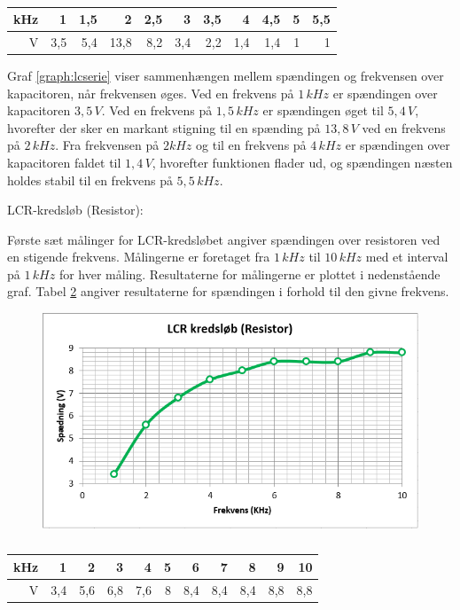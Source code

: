 \begin{table}[H]
\centering
\begin{tabular}{|r|r|r|r|r|r|r|r|r|r|r|} \hline
kHz & 1 & 1,5 & 2 & 2,5 & 3 & 3,5 & 4 & 4,5 & 5 & 5,5 \\ \hline
V & 3,5 & 5,4 & 13,8 & 8,2 & 3,4 & 2,2 & 1,4 & 1,4 & 1 & 1 \\ \hline
\end{tabular}
\caption{}
\label{tabular:lcserie}
\end{table}

Graf \ref{graph:lcserie} viser sammenhængen mellem spændingen og frekvensen over kapacitoren, når frekvensen øges. Ved en frekvens på $1\, kHz$ er spændingen over kapacitoren $3,5\, V$. Ved en frekvens på $1,5\, kHz$ er spændingen øget til $5,4\, V$, hvorefter der sker en markant stigning til en spænding på $13,8\, V$ ved en frekvens på $2\, kHz$. Fra frekvensen på $2 kHz$ og til en frekvens på $4\, kHz$ er spændingen over kapacitoren faldet til $1,4\, V$, hvorefter funktionen flader ud, og spændingen næsten holdes stabil til en frekvens på $5,5\, kHz$.

LCR-kredsløb (Resistor):

Første sæt målinger for LCR-kredsløbet angiver spændingen over resistoren ved en stigende frekvens. Målingerne er foretaget fra $1\, kHz$ til $10\, kHz$ med et interval på $1\, kHz$ for hver måling. Resultaterne for målingerne er plottet i nedenstående graf. Tabel \ref{tabular:lcrmodstand} angiver resultaterne for spændingen i forhold til den givne frekvens.

\begin{figure}[H]
\includegraphics[scale=1]{Setup/Graf7}
\caption{}
\label{graph:lcrmodstand}
\end{figure}

\begin{table}[H]
\centering
\begin{tabular}{|r|r|r|r|r|r|r|r|r|r|r|} \hline
kHz & 1 & 2 & 3 & 4 & 5 & 6 & 7 & 8 & 9 & 10 \\ \hline
V & 3,4 & 5,6 & 6,8 & 7,6 & 8 & 8,4 & 8,4 & 8,4 & 8,8 & 8,8 \\ \hline
\end{tabular}
\caption{}
\label{tabular:lcrmodstand}
\end{table}

